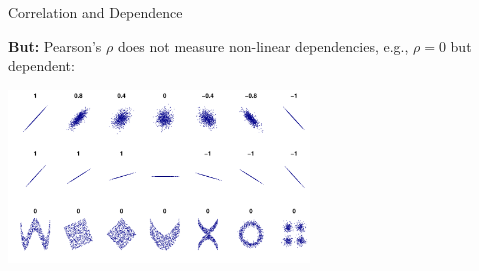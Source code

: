 \documentclass[11pt,compress,t,notes=noshow, aspectratio=169, xcolor=table]{beamer}
\begin{document}
\begin{frame}{Correlation and Dependence}

\textbf{But:} Pearson's $\rho$ does not measure non-linear dependencies, e.g., $\rho = 0$ but dependent:

\centering
\includegraphics[width = 0.6\textwidth, trim=0 0 0 190px, clip]{figure/dependence_2}
\end{frame}
\end{document}
